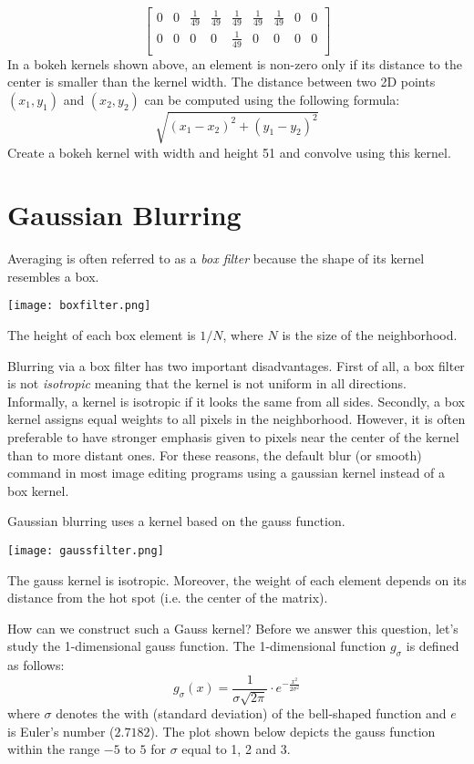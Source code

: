 \documentclass{book}
\begin{document}
\begin{exercise}
$$\begin{bmatrix}
0 & 0 & \frac{1}{49} & \frac{1}{49} & \frac{1}{49} & \frac{1}{49} & \frac{1}{49} & 0 & 0\\
0 & 0 & 0 & 0 & \frac{1}{49} & 0 & 0 & 0 & 0\\
 \end{bmatrix}
$$
In a bokeh kernels shown above, an element is non-zero only if its distance to the center is smaller than the kernel width. The distance between two 2D points $(x_1, y_1)$ and $(x_2, y_2)$ can be computed using the following formula:
$$\sqrt{(x_1 - x_2)^2 + (y_1 - y_2)^2}$$
Create a bokeh kernel with width and height 51 and convolve  using this kernel.
\end{exercise}

\section{Gaussian Blurring}
Averaging is often referred to as a \emph{box filter} because the shape of its kernel resembles a box.
\begin{center}
\texttt{[image: boxfilter.png]}
\end{center}
The height of each box element is $1/N$, where $N$ is the size of the neighborhood.

Blurring via a box filter has two important disadvantages. First of all, a box filter is not \emph{isotropic} meaning that the kernel is not uniform in all directions. Informally, a kernel is isotropic if it looks the same from all sides. Secondly, a box kernel assigns equal weights to all pixels in the neighborhood. However, it is often preferable to have stronger emphasis given to pixels near the center of the kernel than to more distant ones. For these reasons, the default blur (or smooth) command in most image editing programs using a gaussian kernel instead of a box kernel.

Gaussian blurring uses a kernel based on the gauss function.
\begin{center}
\texttt{[image: gaussfilter.png]}
\end{center}
The gauss kernel is isotropic. Moreover, the weight of each element depends on its distance from the hot spot (i.e. the center of the matrix).

How can we construct such a Gauss kernel? Before we answer this question, let's study the 1-dimensional gauss function. The 1-dimensional function $g_\sigma$ is defined as follows:
$$g_\sigma(x) = \frac{1}{\sigma\sqrt{2\pi}} \cdot e^{-\frac{x^2}{2\sigma^2}}$$
where $\sigma$ denotes the with (standard deviation) of the bell-shaped function and $e$ is Euler's number ($2.7182$). The plot shown below depicts the gauss function within the range $-5$ to $5$ for $\sigma$ equal to 1, 2 and 3.
\end{document}
